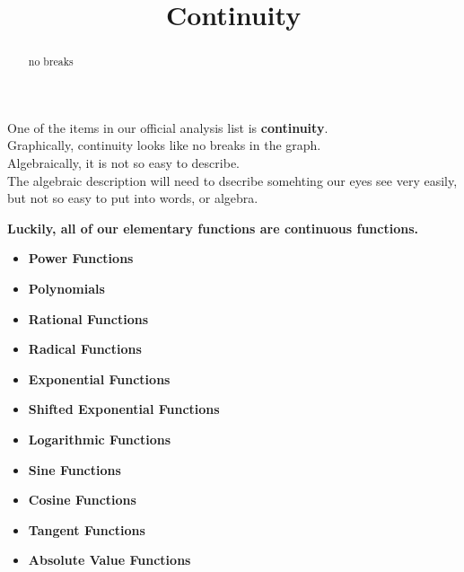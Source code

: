 \documentclass{ximera}
\title{Continuity}
\begin{document}
\begin{abstract}
no breaks
\end{abstract}
\maketitle





One of the items in our official analysis list is \textbf{continuity}. \\

Graphically, continuity looks like no breaks in the graph. \\

Algebraically, it is not so easy to describe. \\


The algebraic description will need to dsecribe somehting our eyes see very easily, but not so easy to put into words, or algebra. \\



\begin{center}
\textbf{\textcolor{red!70!black}{Luckily, all of our elementary functions are continuous functions.}}   \\
\end{center}





\begin{itemize}
	\item \textbf{\textcolor{blue!55!black}{Power Functions}} 
	\item \textbf{\textcolor{blue!55!black}{Polynomials}}
	\begin{itemize}
	\end{itemize}
	\item \textbf{\textcolor{blue!55!black}{Rational Functions}}
	\item \textbf{\textcolor{blue!55!black}{Radical Functions}}
	\item \textbf{\textcolor{blue!55!black}{Exponential Functions}}
	\item \textbf{\textcolor{blue!55!black}{Shifted Exponential Functions}}
	\item \textbf{\textcolor{blue!55!black}{Logarithmic Functions}}
	\item \textbf{\textcolor{blue!55!black}{Sine Functions}}
	\item \textbf{\textcolor{blue!55!black}{Cosine Functions}}
	\item \textbf{\textcolor{blue!55!black}{Tangent Functions}}
	\item \textbf{\textcolor{blue!55!black}{Absolute Value Functions}}
\end{itemize}
\end{document}
